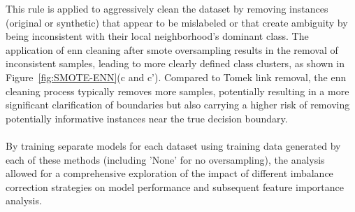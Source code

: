 \documentclass[12pt,a4paper]{report}
\begin{document}
This rule is applied to aggressively clean the dataset by removing instances (original or synthetic) that appear to be mislabeled or that create ambiguity by being inconsistent with their local neighborhood's dominant class. The application of \gls{enn} cleaning after \gls{smote} oversampling results in the removal of inconsistent samples, leading to more clearly defined class clusters, as shown in Figure~\ref{fig:SMOTE-ENN}(c and c'). Compared to Tomek link removal, the \gls{enn} cleaning process typically removes more samples, potentially resulting in a more significant clarification of boundaries but also carrying a higher risk of removing potentially informative instances near the true decision boundary.\\
\\
By training separate models for each dataset using training data generated by each of these methods (including 'None' for no oversampling), the analysis allowed for a comprehensive exploration of the impact of different imbalance correction strategies on model performance and subsequent feature importance analysis.
\end{document}
